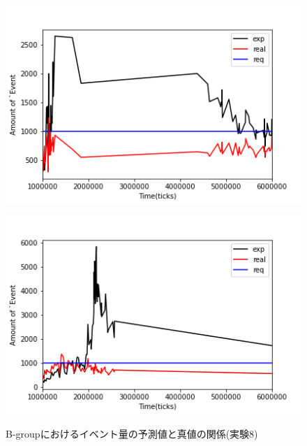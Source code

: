 \documentclass[12pt,a4j,twoside]{jarticle}
\begin{document}
  \begin{figure}
    \begin{minipage}{0.48\hsize}
      \centering
      \includegraphics[width=0.99\hsize]{figures/ExpReal_Complex_Bgroup_4.png}
      \label{subfig:expReal_Complex_B_4}
    \end{minipage}
    \hfill
    \begin{minipage}{0.48\hsize}
      \centering
      \includegraphics[width=0.99\hsize]{figures/ExpReal_Complex_Bgroup_14.png}
      \label{subfig:expReal_Complex_B_14}
    \end{minipage}
    \caption{B-groupにおけるイベント量の予測値と真値の関係(実験8)}
    \label{fig:expReal_Complex_B}
  \end{figure}
\end{document}
